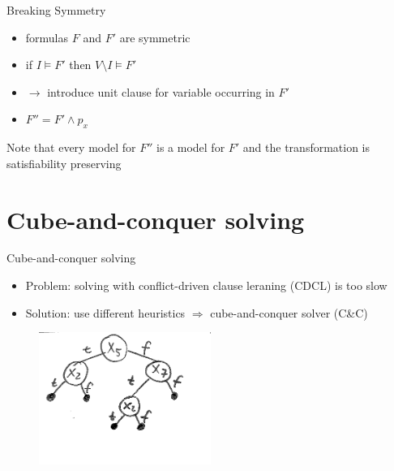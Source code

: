 \documentclass[c,8pt,xcolor...,x11names]{beamer}
\begin{document}
\begin{frame}{Breaking Symmetry}
	\begin{itemize}
		\item formulas $F$ and $F'$ are symmetric
		\pause
		\item if $I \models F'$ then $V \setminus I \models F'$
		\pause
		\item $\rightarrow$ introduce unit clause for variable occurring in $F'$
		\item $F'' = F' \wedge p_x$
	\end{itemize}
	\vspace{5px}
	\pause
	Note that every model for $F''$ is a model for $F'$ and the transformation is satisfiability preserving
\end{frame}


\section{Cube-and-conquer solving}
\begin{frame}{Cube-and-conquer solving}
	\begin{itemize}
		\item Problem: solving with conflict-driven clause leraning (CDCL) is too slow
		\pause
		\item Solution: use different heuristics $\Rightarrow$ cube-and-conquer solver (C\&C)
	\end{itemize}
	\pause
	\begin{figure}
		\includegraphics[width=0.5\textwidth]{images/scan1.png} 
	\end{figure}
\end{frame}
\end{document}
